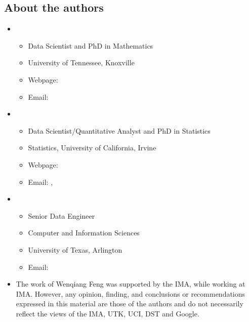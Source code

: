 \documentclass[letterpaper,12pt,english]{sphinxmanual}
\begin{document}
\subsection{About the authors}
\label{\detokenize{preface:about-the-authors}}\begin{itemize}
\item {} 
\begin{itemize}
\item {} 
Data Scientist and PhD in Mathematics

\item {} 
University of Tennessee, Knoxville

\item {} 
Webpage: 

\item {} 
Email: 

\end{itemize}

\item {} 
\begin{itemize}
\item {} 
Data Scientist/Quantitative Analyst and PhD in Statistics

\item {} 
Statistics, University of California, Irvine

\item {} 
Webpage: 

\item {} 
Email: , 

\end{itemize}

\item {} 
\begin{itemize}
\item {} 
Senior Data Engineer

\item {} 
Computer and Information Sciences

\item {} 
University of Texas, Arlington

\item {} 
Email: 

\end{itemize}

\item {} 

The work of Wenqiang Feng was supported by the IMA, while working at IMA. However, any opinion, finding, and conclusions or recommendations expressed in this material are those of the authors and do not necessarily reflect the views of the IMA, UTK, UCI, DST and Google.

\end{itemize}
\end{document}
